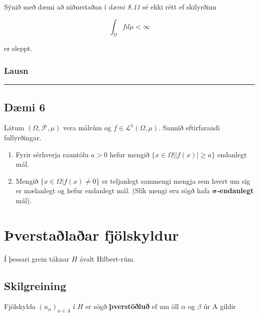 \documentclass[]{book}
\begin{document}
Sýnið með dæmi að niðurstaðan í \emph{dæmi 8.11} sé ekki rétt ef skilyrðinu

\[
\int_\Omega fd\mu < \infty
\]

er sleppt.

\hypertarget{lausn-5}{%
\subsection*{Lausn}\label{lausn-5}}

\begin{center}\rule{0.5\linewidth}{\linethickness}\end{center}

\hypertarget{dmi-6-6}{%
\section*{Dæmi 6}\label{dmi-6-6}}

Látum \((\Omega,\mathcal F,\mu)\) vera málrúm og \(f\in\mathcal L^1(\Omega,\mu)\). Sannið eftirfarandi fullyrðingar.

\begin{enumerate}
\def\labelenumi{\arabic{enumi}.}
\item
  Fyrir sérhverja rauntölu \(a > 0\) hefur mengið \(\{x\in\Omega| |f(x)|\geq a\}\) endanlegt mál.
\item
  Mengið \(\{x\in\Omega|f(x)\neq 0\}\) er teljanlegt sammengi mengja sem hvert um sig er mælanlegt og hefur endanlegt mál. (Slík mengi eru sögð hafa \(\mathbf \sigma\)\textbf{-endanlegt} mál).
\end{enumerate}

\hypertarget{verstalaar-fjolskyldur}{%
\chapter{Þverstaðlaðar fjölskyldur}\label{verstalaar-fjolskyldur}}

Í þessari grein táknar \(H\) ávalt Hilbert-rúm.

\hypertarget{skilgreining-28}{%
\section*{Skilgreining}\label{skilgreining-28}}

Fjölskylda \((u_\alpha)_{\alpha\in A}\) í \(H\) er sögð \textbf{þverstöðluð} ef um öll \(\alpha\) og \(\beta\) úr A gildir
\end{document}
